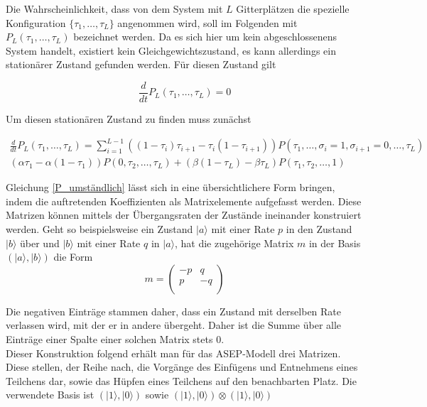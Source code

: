 \documentclass[10pt,a4paper]{report}
\begin{document}
Die Wahrscheinlichkeit, dass von dem System mit $L$ Gitterplätzen die spezielle Konfiguration $\{ \tau_1,\ldots,\tau_L \}$ angenommen wird, soll im Folgenden mit $P_L(\tau_1,\ldots,\tau_L)$ bezeichnet werden. Da es sich hier um kein abgeschlossenens System handelt, existiert kein Gleichgewichtszustand, es kann allerdings ein stationärer Zustand gefunden werden. Für diesen Zustand gilt

\begin{equation}
\frac{d}{dt}P_L(\tau_1,\ldots,\tau_L)=0
\end{equation}

Um diesen stationären Zustand zu finden muss zunächst 

\begin{equation}\label{P_umständlich}
\begin{split}
\frac{d}{dt}P_L(\tau_1,\ldots,\tau_L) = \sum_{i=1}^{L-1}((1-\tau_i)\tau_{i+1}-\tau_i(1-\tau_{i+1}) )P(\tau_1,\ldots,\sigma_i=1,\sigma_{i+1}=0,\ldots,\tau_L)\\
(\alpha\tau_1-\alpha(1-\tau_1)) P(0,\tau_2,\ldots,\tau_L)+(\beta(1-\tau_L)-\beta\tau_L) P(\tau_1,\tau_2,\ldots,1)
\end{split}
\end{equation}

Gleichung \ref{P_umständlich} lässt sich in eine übersichtlichere Form bringen, indem die auftretenden Koeffizienten als Matrixelemente aufgefasst werden. Diese Matrizen können mittels der Übergangsraten der Zustände ineinander konstruiert werden. Geht so beispielsweise ein Zustand $|a\rangle$ mit einer Rate $p$ in den Zustand $|b\rangle$ über und $|b\rangle$ mit einer Rate $q$ in $|a\rangle$, hat die zugehörige Matrix $m$ in der Basis $(|a\rangle,|b\rangle)$ die Form
\begin{equation}
m=
\begin{pmatrix}
-p&q\\
p&-q\\
\end{pmatrix}
\end{equation}

Die negativen Einträge stammen daher, dass ein Zustand mit derselben Rate verlassen wird, mit der er in andere übergeht. Daher ist die Summe über alle Einträge einer Spalte einer solchen Matrix stets 0\cite{ASEP_Update}.\\

Dieser Konstruktion folgend erhält man für das ASEP-Modell drei Matrizen. Diese stellen, der Reihe nach, die Vorgänge des Einfügens und Entnehmens eines Teilchens dar, sowie das Hüpfen eines Teilchens auf den benachbarten Platz. Die verwendete Basis ist $(|1\rangle,|0\rangle)$ sowie $(|1\rangle,|0\rangle)\otimes(|1\rangle,|0\rangle)$
\end{document}
